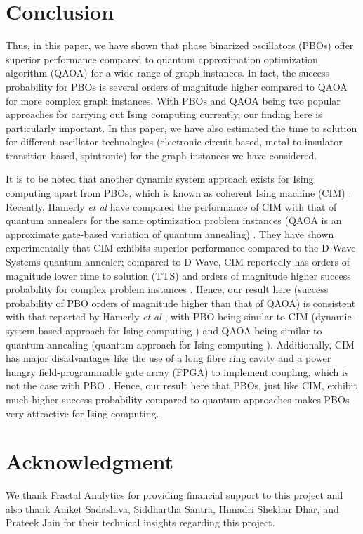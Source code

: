 \documentclass[%
 reprint,
 amsmath,amssymb,
 aps,
]{revtex4-2}
\begin{document}
\section{Conclusion}

Thus, in this paper, we have shown that phase binarized oscillators (PBOs) offer superior performance compared to quantum approximation optimization algorithm (QAOA) for a wide range of graph instances. In fact, the success probability for PBOs is several orders of magnitude higher compared to QAOA for more complex graph instances. With PBOs and QAOA being two popular approaches for carrying out Ising computing currently, our finding here is particularly important. In this paper, we have also estimated the time to solution for different oscillator technologies (electronic circuit based, metal-to-insulator transition based, spintronic) for the graph instances we have considered.


It is to be noted that another dynamic system approach exists for Ising computing apart from PBOs, which is known as coherent Ising machine (CIM) \citep{IsingComputingReview}. Recently, Hamerly \textit{et al} have compared the performance of CIM with that of quantum annealers for the same optimization problem instances (QAOA is an approximate gate-based variation of quantum annealing) \citep{CoherentIMvsQA}. They have shown experimentally that CIM exhibits superior performance compared to the D-Wave Systems quantum annealer; compared to D-Wave, CIM reportedly has orders of magnitude lower time to solution (TTS) and orders of magnitude higher success probability for complex problem instances \citep{CoherentIMvsQA}. Hence, our result here (success probability of PBO orders of magnitude higher than that of QAOA) is consistent with that reported by Hamerly \textit{et al} \citep{CoherentIMvsQA}, with PBO being similar to CIM (dynamic-system-based approach for Ising computing \citep{IsingComputingReview}) and QAOA being similar to quantum annealing (quantum approach for Ising computing \citep{IsingComputingReview}). Additionally, CIM has major disadvantages like the use of a long fibre ring cavity and a power hungry field-programmable gate array (FPGA) to implement coupling, which is not the case with PBO \citep{MIT2}. Hence, our result here that PBOs, just like CIM, exhibit much higher success probability compared to quantum approaches makes PBOs very attractive for Ising computing.

\section*{Acknowledgment}
We thank Fractal Analytics for providing financial support to this project and also thank Aniket Sadashiva, Siddhartha Santra, Himadri Shekhar Dhar, and Prateek Jain for their technical insights regarding this project.
\end{document}
